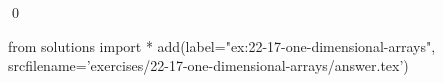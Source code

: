 
\begin{ex}
  \label{ex:22-17-one-dimensional-arrays}
  
  \qed
\end{ex}
\begin{python0}
from solutions import *
add(label="ex:22-17-one-dimensional-arrays",
    srcfilename='exercises/22-17-one-dimensional-arrays/answer.tex')
\end{python0}
